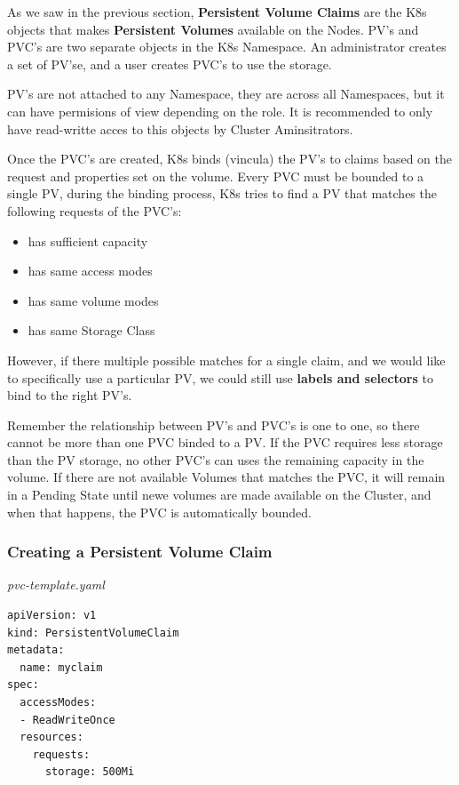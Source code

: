 \documentclass{article}
\newenvironment{blocktemplateIII}[1]{%
    \tcolorbox[beamer,%
    noparskip,breakable,
    ,colframe=Red,%
    colbacklower=LimeGreen!75!LightGreen,%
    title=#1]}%
    {\endtcolorbox}
\newenvironment{codetemplate}[1][]{%
  \mybasecolorbox[#1]
  \itshape
}{%
  \endmybasecolorbox
}
\begin{document}
As we saw in the previous section, \textbf{Persistent Volume Claims} are the K8s objects that makes \textbf{Persistent Volumes} available on the Nodes. PV's and PVC's are two separate objects in the K8s Namespace. An administrator creates a set of PV'se, and a user creates PVC's to use the storage.

\begin{blocktemplateIII}{WARNING}
PV's are not attached to any Namespace, they are across all Namespaces, but it can have permisions of view depending on the role. It is recommended to only have read-writte acces to this objects by Cluster Aminsitrators.
\end{blocktemplateIII}

Once the PVC's are created, K8s binds (vincula) the PV's to claims based on the request and properties set on the volume. Every PVC must be bounded to a single PV, during the binding process, K8s tries to find a PV that matches the following requests of the PVC's:

\begin{itemize}
    \item has sufficient capacity
    \item has same access modes
    \item has same volume modes
    \item has same Storage Class
\end{itemize}

However, if there multiple possible matches for a single claim, and we would like to specifically use a particular PV, we could still use \textbf{labels and selectors} to bind to the right PV's.

\begin{blocktemplateIII}{WARNING}
Remember the relationship between PV's and PVC's is one to one, so there cannot be more than one PVC binded to a PV. If the PVC requires less storage than the PV storage, no other PVC's can uses the remaining capacity in the volume. If there are not available Volumes that matches the PVC, it will remain in a Pending State until newe volumes are made available on the Cluster, and when that happens, the PVC is automatically bounded.
\end{blocktemplateIII}

\subsubsection{Creating a Persistent Volume Claim}

\begin{codetemplate}{pvc-template.yaml}
\begin{verbatim}
apiVersion: v1
kind: PersistentVolumeClaim
metadata:
  name: myclaim
spec:
  accessModes:
  - ReadWriteOnce
  resources:
    requests:
      storage: 500Mi
\end{verbatim}
\end{codetemplate}
\end{document}
